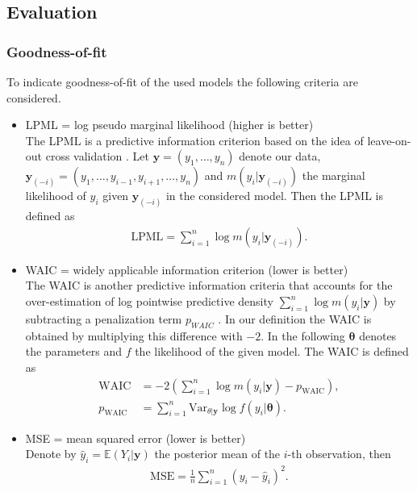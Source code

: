 \documentclass[12pt,a4paper]{article}
\begin{document}
\subsection{Evaluation}

\subsubsection{Goodness-of-fit}
To indicate goodness-of-fit of the used models the following criteria are considered. \medskip

\begin{itemize}
    \item LPML = log pseudo marginal likelihood (higher is better)\\
    The LPML is a predictive information criterion based on the idea of leave-on-out cross validation \cite{lecturenotes}. Let $\mathbf{y} = (y_1, \dots , y_n )$ denote our data, $\mathbf{y}_{(-i)} = (y_1, \dots , y_{i-1}, y_{i+1}, \dots, y_n )$ and $m(y_i | \mathbf{y}_{(-i)}) $ the marginal likelihood of $y_i$ given $\mathbf{y}_{(-i)}$ in the considered model. Then the LPML is defined as
    \begin{align*}
        \text{LPML} = \sum_{i=1}^n \log m(y_i | \mathbf{y}_{(-i)}).
    \end{align*}
    
    \item WAIC = widely applicable information criterion (lower is better)\\
    The WAIC is another predictive information criteria that accounts for the over-estimation of log pointwise predictive density $\sum_{i=1}^n \log m(y_i | \mathbf{y})$ by subtracting a penalization term $p_{WAIC}$ \cite{lecturenotes}. In our definition the WAIC is obtained by multiplying this difference with $-2$. In the following $\mathbf{\theta}$ denotes the parameters and $f$ the likelihood of the given model. The WAIC is defined as
    \begin{align*}
        \text{WAIC} &= -2 \left( \sum_{i=1}^n \log m(y_i | \mathbf{y} ) - 
        p_{\text{WAIC}} \right), \\
        p_{\text{WAIC}} &= \sum_{i=1}^n \text{Var}_{\theta | \mathbf{y}} \log 
        f(y_i | \mathbf{\theta} ).
    \end{align*}

    \item MSE = mean squared error (lower is better)\\
    Denote by $\hat{y}_i = \mathbb{E}(Y_i | \mathbf{y})$ the posterior mean of the $i$-th observation, then
    \begin{align*}
        \text{MSE} = \frac{1}{n} \sum_{i=1}^n (y_i - \hat{y}_i)^2.
    \end{align*}


\end{itemize}
\end{document}
